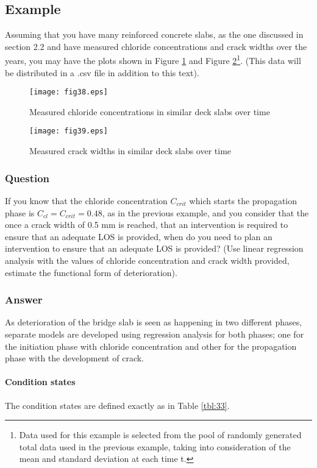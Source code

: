 \subsection{Example}
Assuming that you have many reinforced concrete slabs, as the one discussed in section 2.2 and have measured chloride concentrations and crack widths over the years, you may have the plots shown in Figure \ref{fig:38} and Figure \ref{fig:39}\footnote{Data used for this example is selected from the pool of randomly generated total data used in the previous example, taking into consideration of the mean and standard deviation at each time t.}. (This data will be distributed in a .csv file in addition to this text).
\begin{figure}[h]
\texttt{[image: fig38.eps]}
\caption{Measured chloride concentrations in similar deck slabs over time}\label{fig:38}
\end{figure}
\begin{figure}[h]
\texttt{[image: fig39.eps]}
\caption{Measured crack widths in similar deck slabs over time}\label{fig:39}
\end{figure}
\subsubsection{Question}
If you know that the chloride concentration ${C_{crit}}$ which starts the propagation phase is ${C_{cl}} = {C_{crit}} = 0.48$, as in the previous example, and you consider that the once a crack width of 0.5 mm is reached, that an intervention is required to ensure that an adequate LOS is provided, when do you need to plan an intervention to ensure that an adequate LOS is provided? (Use linear regression analysis with the values of chloride concentration and crack width provided, estimate the functional form of deterioration).
\subsubsection{Answer}
As deterioration of the bridge slab is seen as happening in two different phases, separate models are developed using regression analysis for both phases; one for the initiation phase with chloride concentration and other for the propagation phase with the development of crack.
\paragraph{Condition states}
The condition states are defined exactly as in Table \ref{tbl:33}.
